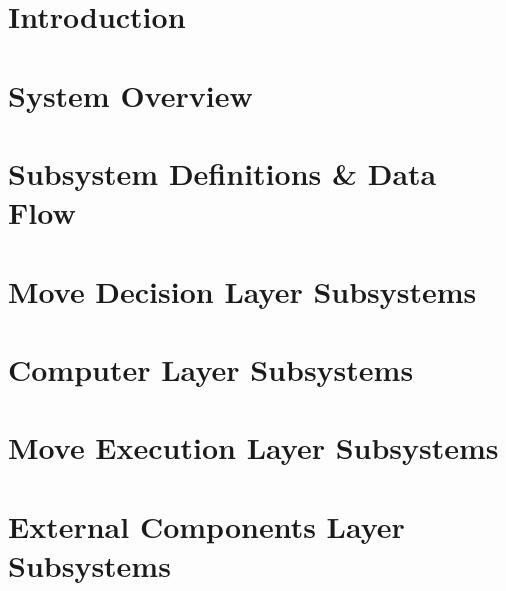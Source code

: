 \documentclass[11pt,letterpaper]{article}
\begin{document}
\listoffigures
\listoftables
\newpage

\section{Introduction}

\newpage
\section{System Overview}

\newpage
\section{Subsystem Definitions \& Data Flow}

\newpage
\section{Move Decision Layer Subsystems}

\newpage
\section{Computer Layer Subsystems}

\newpage
\section{Move Execution Layer Subsystems}

\newpage
\section{External Components Layer Subsystems}

\newpage

% 
% 
\end{document}
